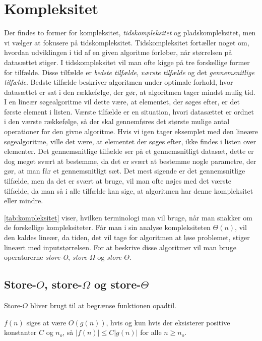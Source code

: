 \section{Kompleksitet} \label{kap:kompleksitet}

Der findes to former for kompleksitet, \emph{tidskompleksitet} og pladskompleksitet, men vi vælger at fokusere på tidskompleksitet. 
Tidskompleksitet fortæller noget om, hvordan udviklingen i tid af en given algoritme forløber, når størrelsen på datasættet stiger. I tidskompleksitet vil man ofte kigge på tre forskellige former for tilfælde. Disse tilfælde er \emph{bedste tilfælde}, \emph{værste tilfælde} og det \emph{gennemsnitlige tilfælde}. 
Bedste tilfælde beskriver algoritmen under optimale forhold, hvor datasættet er sat i den rækkefølge, der gør, at algoritmen tager mindst mulig tid. I en lineær søgealgoritme vil dette være, at elementet, der søges efter, er det første element i listen. 
Værste tilfælde er en situation, hvori datasættet er ordnet i den værste rækkefølge, så der skal gennemføres det største mulige antal operationer for den givne algoritme. Hvis vi igen tager eksemplet med den lineære søgealgoritme, ville det være, at elementet der søges efter, ikke findes i listen over elementer.
Det gennemsnitlige tilfælde ser på et gennemsnitligt datasæt, dette er dog meget svært at bestemme, da det er svært at bestemme nogle parametre, der gør, at man får et gennemsnitligt sæt.
Det mest sigende er det gennemsnitlige tilfælde, men da det er svært at bruge, vil man ofte nøjes med det værste tilfælde, da man så i alle tilfælde kan sige, at algoritmen har denne kompleksitet eller mindre.





\autoref{tab:kompleksitet} viser, hvilken terminologi man vil bruge, når man snakker om de forskellige kompleksiteter. Får man i sin analyse kompleksiteten $\Theta(n)$, vil den kaldes lineær, da tiden, det vil tage for algoritmen at løse problemet, stiger lineært med inputstørrelsen.
For at beskrive disse algoritmer vil man bruge operatorerne \emph{store-O}, \emph{store-$\Omega$} og \emph{store-$\Theta$}. 
\subsection{Store-$O$, store-$\Omega$ og store-$\Theta$}
Store-$O$ bliver brugt til at begrænse funktionen opadtil. 

\begin{defn}
$f(n)$ siges at være $O(g(n))$, hvis og kun hvis der eksisterer positive konstanter $C$ og $n_o$, så $|f(n)| \leq C |g(n)|$ for alle $n \geq n_o$.
\end{defn}

